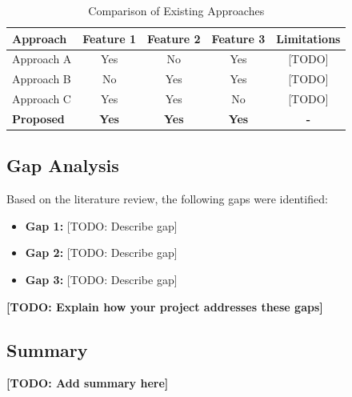 \begin{table}[H]
  \centering
  \caption{Comparison of Existing Approaches}
  \label{tab:literature_comparison}
  \begin{tabular}{@{}lcccc@{}}
    \toprule
    \textbf{Approach} & \textbf{Feature 1} & \textbf{Feature 2} & \textbf{Feature 3} & \textbf{Limitations} \\ \midrule
    Approach A \cite{ref1} & Yes & No & Yes & [TODO] \\
    Approach B \cite{ref2} & No & Yes & Yes & [TODO] \\
    Approach C \cite{ref3} & Yes & Yes & No & [TODO] \\
    \textbf{Proposed} & \textbf{Yes} & \textbf{Yes} & \textbf{Yes} & \textbf{-} \\ \bottomrule
  \end{tabular}
\end{table}

\subsection{Gap Analysis}


Based on the literature review, the following gaps were identified:

\begin{itemize}
  \item \textbf{Gap 1:} [TODO: Describe gap]
  \item \textbf{Gap 2:} [TODO: Describe gap]
  \item \textbf{Gap 3:} [TODO: Describe gap]
\end{itemize}

\textbf{[TODO: Explain how your project addresses these gaps]}

\subsection{Summary}


\textbf{[TODO: Add summary here]}